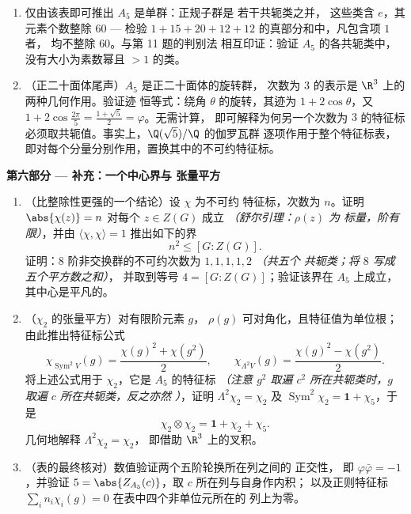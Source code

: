 \begin{problem}
\begin{enumerate}[resume]
        $\varphi^2 + \bar\varphi^2 = 3$），$\langle\chi_2,
        \chi_3\rangle = 0$，以及弗罗贝尼乌斯整除性（第
        8 题）对全部五个次数成立。在特征标表中，何处能
        \emph{看出}它与 $S_5$ 的差异，其全部
        特征标值都是有理整数？
  \item 仅由该表即可推出 $A_5$ 是单群：正规子群是
        若干共轭类之并，
        这些类含 $e$，其元素个数整除 $60$ --- 检验
        $1 + 15 + 20 + 12 + 12$ 的真部分和中，凡包含项 $1$ 者，
        均不整除 $60$。与第 11 题的判别法
        相互印证：验证 $A_5$ 的各共轭类中，
        没有大小为素数幂且 $> 1$ 的类。
  \item （正二十面体尾声）$A_5$ 是正二十面体的旋转群，
        次数为 $3$ 的表示是
        $\R^3$ 上的两种几何作用。验证迹
        恒等式：绕角 $\theta$ 的旋转，其迹为 $1 +
        2\cos\theta$，又 $1 + 2\cos\frac{2\pi}5 =
        \frac{1+\sqrt5}2 = \varphi$。无需计算，
        即可解释为何另一个次数为 $3$ 的特征标
        必须取共轭值。事实上，$\Q(\sqrt5)/\Q$ 的伽罗瓦群
        逐项作用于整个特征标表，
        即对每个分量分别作用，置换其中的不可约特征标。
\end{enumerate}

\medskip
    \noindent\textbf{第六部分 --- 补充：一个中心界与
张量平方}
\begin{enumerate}[resume]
  \item （比整除性更强的一个结论）设 $\chi$ 为不可约
        特征标，次数为 $n$。证明 $\abs{\chi(z)} = n$ 对每个
        $z \in Z(G)$ 成立 \emph{（舒尔引理：$\rho(z)$ 为
        标量，阶有限）}，并由
        $\langle\chi, \chi\rangle = 1$ 推出如下的界
        \[
        n^2 \leq [G : Z(G)] .
        \]
        证明：$8$ 阶非交换群的不可约次数为
        $1, 1, 1, 1, 2$ \emph{（共五个
        共轭类；将 $8$ 写成五个平方数之和）}，
        并取到等号 $4 = [G : Z(G)]$；验证该界在
        $A_5$ 上成立，其中心是平凡的。
  \item （$\chi_2$ 的张量平方）对有限阶元素 $g$，
        $\rho(g)$ 可对角化，且特征值为单位根；
        由此推出特征标公式
        \[
        \chi_{\operatorname{Sym}^2 V}(g)
        = \frac{\chi(g)^2 + \chi(g^2)}2,
        \qquad
        \chi_{\Lambda^2 V}(g)
        = \frac{\chi(g)^2 - \chi(g^2)}2 .
        \]
        将上述公式用于 $\chi_2$，它是 $A_5$ 的特征标 \emph{（注意 $g^2$
        取遍 $c^2$ 所在共轭类时，$g$ 取遍 $c$ 所在共轭类，反之亦然
        ）}，证明 $\Lambda^2\chi_2 =
        \chi_2$ 及 $\operatorname{Sym}^2\chi_2 = \mathbf 1 +
        \chi_5$，于是
        \[
        \chi_2\otimes\chi_2 = \mathbf 1 + \chi_2 + \chi_5 .
        \]
        几何地解释 $\Lambda^2\chi_2 = \chi_2$，
        即借助 $\R^3$ 上的叉积。
  \item （表的最终核对）数值验证两个五阶轮换所在列之间的
        正交性，
        即 $\varphi\bar\varphi = -1$，并验证 $5 =
        \abs{Z_{A_5}(c)}$，取 $c$ 所在列与自身作内积；
        以及正则特征标 $\sum_i
        n_i\chi_i(g) = 0$ 在表中四个非单位元所在的
        列上为零。
\end{enumerate}
\end{problem}
